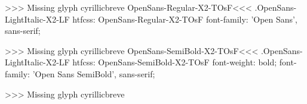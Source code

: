 >>>
Missing glyph	cyrillicbreve
\<OpenSans-Regular-X2-TOsF\><<<
.OpenSans-LightItalic-X2-LF
htfcss:  OpenSans-Regular-X2-TOsF  font-family: 'Open Sans', sans-serif;

>>>
Missing glyph	cyrillicbreve
\<OpenSans-SemiBold-X2-TOsF\><<<
.OpenSans-LightItalic-X2-LF
htfcss:  OpenSans-SemiBold-X2-TOsF  font-weight: bold; font-family: 'Open Sans SemiBold', sans-serif;

>>>
Missing glyph	cyrillicbreve
\bye

